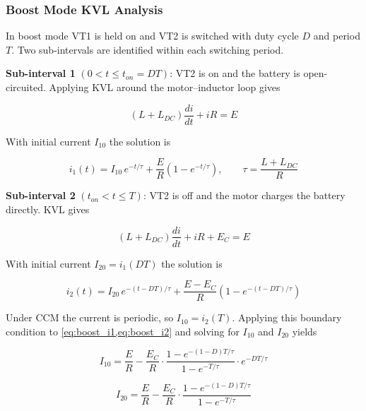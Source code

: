 \subsubsection{Boost Mode KVL Analysis}
\label{subsubsec:boost_kvl}

In boost mode VT1 is held on and VT2 is switched with duty cycle $D$
and period $T$. Two sub-intervals are identified within each switching
period.

\textbf{Sub-interval 1} $(0 < t \leq t_{on} = DT)$: VT2 is on and
the battery is open-circuited. Applying KVL around the motor--inductor
loop gives

\begin{equation}
    (L + L_{DC})\frac{di}{dt} + iR = E
    \label{eq:boost_on}
\end{equation}

With initial current $I_{10}$ the solution is

\begin{equation}
    i_1(t) = I_{10}\,e^{-t/\tau}
             + \frac{E}{R}\!\left(1 - e^{-t/\tau}\right), \qquad
    \tau = \frac{L + L_{DC}}{R}
    \label{eq:boost_i1}
\end{equation}

\textbf{Sub-interval 2} $(t_{on} < t \leq T)$: VT2 is off and the
motor charges the battery directly. KVL gives

\begin{equation}
    (L + L_{DC})\frac{di}{dt} + iR + E_C = E
    \label{eq:boost_off}
\end{equation}

With initial current $I_{20} = i_1(DT)$ the solution is

\begin{equation}
    i_2(t) = I_{20}\,e^{-(t-DT)/\tau}
             + \frac{E - E_C}{R}
               \!\left(1 - e^{-(t-DT)/\tau}\right)
    \label{eq:boost_i2}
\end{equation}

Under CCM the current is periodic, so $I_{10} = i_2(T)$. Applying
this boundary condition to \cref{eq:boost_i1,eq:boost_i2} and solving
for $I_{10}$ and $I_{20}$ yields

\begin{equation}
    I_{10} = \frac{E}{R}
             - \frac{E_C}{R}
               \cdot\frac{1 - e^{-(1-D)T/\tau}}{1 - e^{-T/\tau}}
               \cdot e^{-DT/\tau}
    \label{eq:boost_I10}
\end{equation}

\begin{equation}
    I_{20} = \frac{E}{R}
             - \frac{E_C}{R}
               \cdot\frac{1 - e^{-(1-D)T/\tau}}{1 - e^{-T/\tau}}
    \label{eq:boost_I20}
\end{equation}

